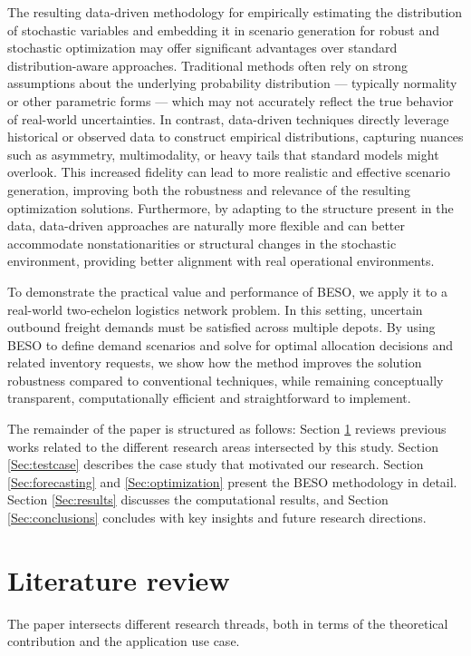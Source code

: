 \documentclass[11pt]{article}
\begin{document}
The resulting data-driven methodology for empirically estimating the distribution of stochastic variables and embedding it in scenario generation for robust and stochastic optimization may offer significant advantages over standard distribution-aware approaches. Traditional methods often rely on strong assumptions about the underlying probability distribution — typically normality or other parametric forms — which may not accurately reflect the true behavior of real-world uncertainties. In contrast, data-driven techniques directly leverage historical or observed data to construct empirical distributions, capturing nuances such as asymmetry, multimodality, or heavy tails that standard models might overlook. This increased fidelity can lead to more realistic and effective scenario generation, improving both the robustness and relevance of the resulting optimization solutions. Furthermore, by adapting to the structure present in the data, data-driven approaches are naturally more flexible and can better accommodate nonstationarities or structural changes in the stochastic environment, providing better alignment with real operational environments.

To demonstrate the practical value and performance of BESO, we apply it to a real-world two-echelon logistics network problem. In this setting, uncertain outbound freight demands must be satisfied across multiple depots. By using BESO to define demand scenarios and solve for optimal allocation decisions and related inventory requests, we show how the method improves the solution robustness compared to conventional techniques, while remaining conceptually transparent, computationally efficient and straightforward to implement.

The remainder of the paper is structured as follows: Section \ref{Sec:literature} reviews previous works related to the different research areas intersected by this study. Section \ref{Sec:testcase} describes the case study that motivated our research. Section \ref{Sec:forecasting} and \ref{Sec:optimization} present the BESO methodology in detail.  Section \ref{Sec:results} discusses the computational results, and Section \ref{Sec:conclusions} concludes with key insights and future research directions.

\section{Literature review} \label{Sec:literature}

The paper intersects different research threads, both in terms of the theoretical contribution and the application use case.
\end{document}
